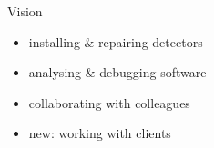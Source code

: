 \begin{frame}{Vision}
%
  \begin{minipage}{.6\textwidth}
    \begin{itemize}\itemspace{4ex}
      \item installing \& repairing detectors
      \item analysing \& debugging software
      \item collaborating with colleagues
      \item new: working with clients
    \end{itemize}
  \end{minipage}
  \begin{minipage}{.35\textwidth}
  \end{minipage}
%
\end{frame}
